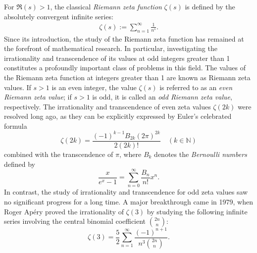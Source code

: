 \documentclass[11pt]{article}
\def\N{\mathbb{N}}
\theoremstyle{plain}
\theoremstyle{definition}
\begin{document}
For $\Re(s) > 1$, the classical \emph{Riemann zeta function} $\zeta(s)$ is defined by the absolutely convergent infinite series:
\begin{align}
\zeta(s):=\sum_{n=1}^\infty \frac1{n^s}.
\end{align}
Since its introduction, the study of the Riemann zeta function has remained at the forefront of mathematical research. In particular, investigating the irrationality and transcendence of its values at odd integers greater than 1 constitutes a profoundly important class of problems in this field. The values of the Riemann zeta function at integers greater than 1 are known as Riemann zeta values. If $s>1$ is an even integer, the value $\zeta(s)$ is referred to as an \emph{even Riemann zeta value}; if $s>1$ is odd, it is called an \emph{odd Riemann zeta value}, respectively. The irrationality and transcendence of even zeta values $\zeta(2k)$ were resolved long ago, as they can be explicitly expressed by Euler's celebrated formula \[\zeta(2k)=\frac{(-1)^{k-1}B_{2k}(2\pi)^{2k}}{2(2k)!}\quad (k\in\N)\]
combined with the transcendence of $\pi$, where $B_k$ denotes the \emph{Bernoulli numbers} defined by
\[\frac{x}{e^x-1}=\sum_{n=0}^{\infty}{\frac{B_n}{n!}x^n}.\]
In contrast, the study of irrationality and transcendence for odd zeta values saw no significant progress for a long time. A major breakthrough came in 1979, when Roger Ap\'ery \cite{Apery1978} proved the irrationality of $\zeta(3)$ by studying the following infinite series involving the central binomial coefficient $\binom{2n}{n}$:
\begin{equation*}
\zeta(3)=\frac52 \sum_{n=1}^\infty \frac{(-1)^{n+1}}{n^3\binom{2n}{n}}.
\end{equation*}
\end{document}
